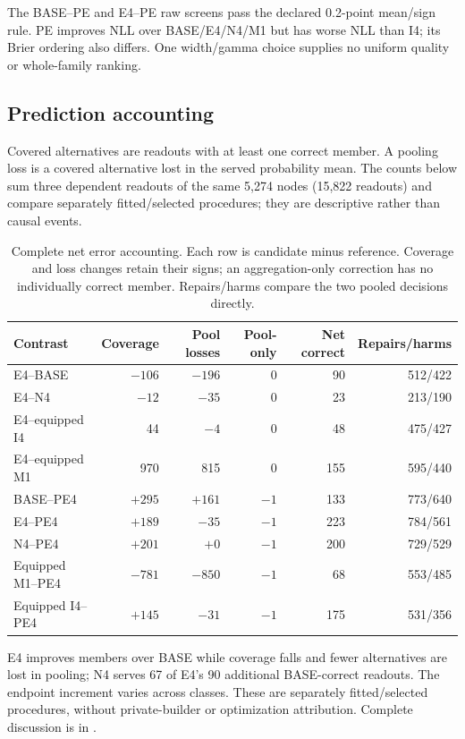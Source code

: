 The BASE--PE and E4--PE raw screens pass the declared 0.2-point mean/sign rule. PE improves NLL over BASE/E4/N4/M1 but has worse NLL than I4; its Brier ordering also differs. One width/gamma choice supplies no uniform quality or whole-family ranking.

\subsection{Prediction accounting}
Covered alternatives are readouts with at least one correct member. A pooling loss is a covered alternative lost in the served probability mean. The counts below sum three dependent readouts of the same 5,274 nodes (15,822 readouts) and compare separately fitted/selected procedures; they are descriptive rather than causal events.

\begin{table}[t]
\centering\small\setlength{\tabcolsep}{4pt}
\caption{Complete net error accounting. Each row is candidate minus reference. Coverage and loss changes retain their signs; an aggregation-only correction has no individually correct member. Repairs/harms compare the two pooled decisions directly.}
\label{tab:E-PE-errors}
\begin{tabular}{lrrrrr}
\toprule
Contrast & Coverage & Pool losses & Pool-only & Net correct & Repairs/harms\\
\midrule
E4--BASE & $-106$ & $-196$ & 0 & 90 & 512/422\\
E4--N4 & $-12$ & $-35$ & 0 & 23 & 213/190\\
E4--equipped I4 & 44 & $-4$ & 0 & 48 & 475/427\\
E4--equipped M1 & 970 & 815 & 0 & 155 & 595/440\\
\midrule
BASE--PE4 & $+295$ & $+161$ & $-1$ & 133 & 773/640\\
E4--PE4 & $+189$ & $-35$ & $-1$ & 223 & 784/561\\
N4--PE4 & $+201$ & $+0$ & $-1$ & 200 & 729/529\\
Equipped M1--PE4 & $-781$ & $-850$ & $-1$ & 68 & 553/485\\
Equipped I4--PE4 & $+145$ & $-31$ & $-1$ & 175 & 531/356\\
\bottomrule\end{tabular}\end{table}

E4 improves members over BASE while coverage falls and fewer alternatives are lost in pooling; N4 serves 67 of E4's 90 additional BASE-correct readouts. The endpoint increment varies across classes. These are separately fitted/selected procedures, without private-builder or optimization attribution. Complete discussion is in .

